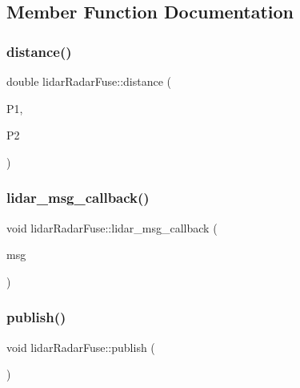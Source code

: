 \subsection{Member Function Documentation}
\mbox{\label{classlidarRadarFuse_abb3cfece2eb2a2394611050d28d82c27}} 
\subsubsection{\texorpdfstring{distance()}{distance()}}
{\footnotesize\ttfamily double lidar\+Radar\+Fuse\+::distance (\begin{DoxyParamCaption}\item[{geometry\+\_\+msgs\+::\+Point}]{P1,  }\item[{geometry\+\_\+msgs\+::\+Point}]{P2 }\end{DoxyParamCaption})\hspace{0.3cm}{\ttfamily [inline]}}

\mbox{\label{classlidarRadarFuse_a3fe1662b4743bdff5d40e95f8040e2c2}} 
\subsubsection{\texorpdfstring{lidar\+\_\+msg\+\_\+callback()}{lidar\_msg\_callback()}}
{\footnotesize\ttfamily void lidar\+Radar\+Fuse\+::lidar\+\_\+msg\+\_\+callback (\begin{DoxyParamCaption}\item[{autoware\+\_\+msgs\+::\+Detected\+Object\+Array}]{msg }\end{DoxyParamCaption})\hspace{0.3cm}{\ttfamily [inline]}}

\mbox{\label{classlidarRadarFuse_aac3e1d2b10882c6b4ec0c8c1c078be73}} 
\subsubsection{\texorpdfstring{publish()}{publish()}}
{\footnotesize\ttfamily void lidar\+Radar\+Fuse\+::publish (\begin{DoxyParamCaption}{ }\end{DoxyParamCaption})\hspace{0.3cm}{\ttfamily [inline]}}

